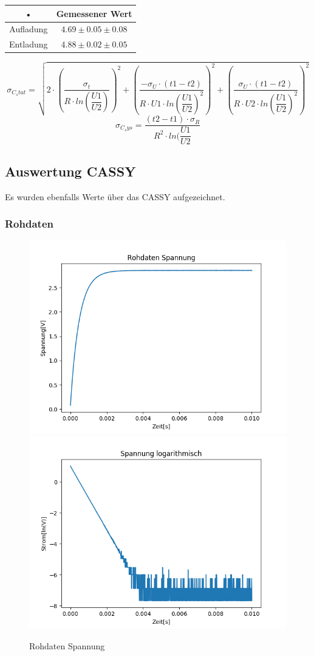 \documentclass[12pt,a4paper]{article}
\begin{document}
\begin{tabular}{|c|c|}
\hline 
• & Gemessener Wert \\ 
\hline 
Aufladung & $4.69\pm 0.05\pm 0.08$ \\ 
\hline 
Entladung & $4.88\pm 0.02\pm 0.05$ \\ 
\hline 
\end{tabular} 
\begin{equation}
\sigma_{C_stat} = \sqrt{2\cdot\left(\dfrac{\sigma_t}{R\cdot ln(\dfrac{U1}{U2})}\right)^{2}+\left(\dfrac{-\sigma_U\cdot(t1-t2)}{R\cdot U1\cdot ln(\dfrac{U1}{U2})^{2}}\right)^{2}+\left(\dfrac{\sigma_U\cdot(t1-t2)}{R\cdot U2\cdot ln(\dfrac{U1}{U2})^{2}}\right)^{2}}
\end{equation}
\begin{equation}
\sigma_{C_sys} = \dfrac{(t2-t1)\cdot \sigma_R}{R^{2}\cdot ln(\dfrac{U1}{U2}}
\end{equation}

\subsection{Auswertung CASSY}
Es wurden ebenfalls Werte über das CASSY aufgezeichnet.
\subsubsection{Rohdaten}
\begin{figure}[H]
\begin{center}
\includegraphics[width=0.75\linewidth]{Bilder/Kondensator_U}
\includegraphics[width=0.75\linewidth]{Bilder/Kondensator_logU}
\caption[Rohdaten logarith. A]{Rohdaten Spannung}
\label{fig:RohU}
\end{center}
\end{figure}
\end{document}
